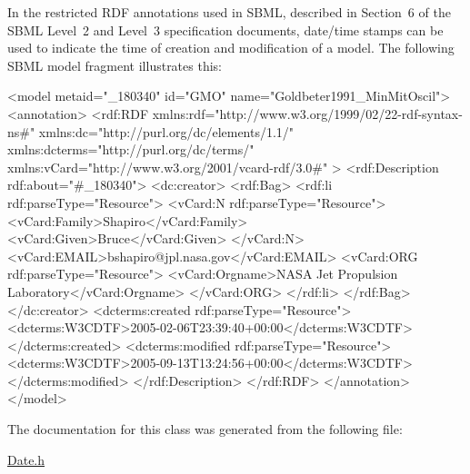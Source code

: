 In the restricted R\+DF annotations used in S\+B\+ML, described in Section~6 of the S\+B\+ML Level~2 and Level~3 specification documents, date/time stamps can be used to indicate the time of creation and modification of a model. The following S\+B\+ML model fragment illustrates this\+: \begin{DoxyVerb}<model metaid="_180340" id="GMO" name="Goldbeter1991_MinMitOscil">
    <annotation>
        <rdf:RDF xmlns:rdf="http://www.w3.org/1999/02/22-rdf-syntax-ns#"
                 xmlns:dc="http://purl.org/dc/elements/1.1/"
                 xmlns:dcterms="http://purl.org/dc/terms/"
                 xmlns:vCard="http://www.w3.org/2001/vcard-rdf/3.0#" >
            <rdf:Description rdf:about="#_180340">
                <dc:creator>
                    <rdf:Bag>
                        <rdf:li rdf:parseType="Resource">
                            <vCard:N rdf:parseType="Resource">
                                <vCard:Family>Shapiro</vCard:Family>
                                <vCard:Given>Bruce</vCard:Given>
                            </vCard:N>
                            <vCard:EMAIL>bshapiro@jpl.nasa.gov</vCard:EMAIL>
                            <vCard:ORG rdf:parseType="Resource">
                                <vCard:Orgname>NASA Jet Propulsion Laboratory</vCard:Orgname>
                            </vCard:ORG>
                        </rdf:li>
                    </rdf:Bag>
                </dc:creator>
                <dcterms:created rdf:parseType="Resource">
                    <dcterms:W3CDTF>2005-02-06T23:39:40+00:00</dcterms:W3CDTF>
                </dcterms:created>
                <dcterms:modified rdf:parseType="Resource">
                    <dcterms:W3CDTF>2005-09-13T13:24:56+00:00</dcterms:W3CDTF>
                </dcterms:modified>
            </rdf:Description>
        </rdf:RDF>
    </annotation>
</model>
\end{DoxyVerb}
 

The documentation for this class was generated from the following file\+:\begin{DoxyCompactItemize}
\item 
\hyperlink{_date_8h}{Date.\+h}\end{DoxyCompactItemize}

